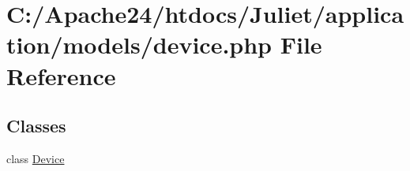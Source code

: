 \hypertarget{device_8php}{\section{C\-:/\-Apache24/htdocs/\-Juliet/application/models/device.php File Reference}
\label{device_8php}
}
\subsection*{Classes}
\begin{DoxyCompactItemize}
\item 
class \hyperlink{class_device}{Device}
\end{DoxyCompactItemize}
